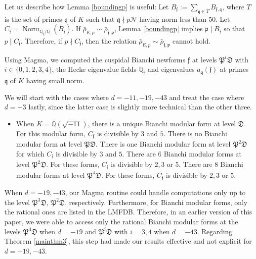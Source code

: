 \documentclass[]{article}
\newcommand {\QQ}{{\mathbb{Q}}}
\newcommand {\mfp}{{\mathfrak{P}}}
\DeclareMathOperator{\Norm}{Norm}
\newcounter{cases}
\begin{document}
Let us describe how Lemma \ref{boundingp} is useful: Let $B_{\mathfrak{f}}:=\sum_{\mathfrak{q} \in T} B_{\mathfrak{f}, \mathfrak{q}}$, where $T$ is the set of primes $\mathfrak{q}$ of $K$ such that $\mathfrak{q}\nmid p\mathcal{N}$ having norm less than $50$. Let $C_{\mathfrak{f}}=\Norm_{\QQ_\mathfrak{f}/\QQ}(B_{\mathfrak{f}})$. If $\bar{\rho}_{E, p} \sim \bar{\rho}_{\mathfrak{f}, \mathfrak{p}}$, Lemma \ref{boundingp} implies $\mathfrak{p}\mid B_{\mathfrak{f}}$ so that $p\mid C_{\mathfrak{f}}$. Therefore, if $p\nmid C_{\mathfrak{f}}$, then the relation $\bar{\rho}_{E, p} \sim \bar{\rho}_{\mathfrak{f}, \mathfrak{p}}$ cannot hold.


Using Magma, we computed the cuspidal Bianchi newforms $\mathfrak{f}$ at levels $\mfp^i\mathfrak{D}$ with $i\in\{0,1,2,3,4\}$, the Hecke eigenvalue fields $\QQ_{\mathfrak{f}}$ and eigenvalues $a_{\mathfrak{q}}({\mathfrak{f}})$ at primes $\mathfrak{q}$ of $K$ having small norm.

We will start with the cases where $d=-11,-19,-43$ and treat the case where $d=-3$ lastly, since the latter case is slightly more technical than the other three.


\begin{itemize}
    \item When $K=\QQ(\sqrt{-11})$, there is a unique Bianchi modular form at level $\mathfrak{D}$. For this modular form, $C_{\mathfrak{f}}$ is divisible by $3$ and $5$. There is no Bianchi modular form at level $\mfp\mathfrak{D}$. There is one Bianchi modular form at level $\mfp^2\mathfrak{D}$ for which $C_{\mathfrak{f}}$ is divisible by $3$ and $5$. There are $6$ Bianchi modular forms at level $\mfp^2\mathfrak{D}$. For these forms, $C_{\mathfrak{f}}$ is divisible by $2,3$ or $5$. There are $8$ Bianchi modular forms at level $\mfp^4\mathfrak{D}$. For these forms, $C_{\mathfrak{f}}$ is divisible by $2,3$ or $5$.
\end{itemize}

When $d=-19,-43$, our Magma routine could handle computations only up to the level $\mfp^3\mathfrak{D}$, $\mfp^2\mathfrak{D}$, respectively. Furthermore, for Bianchi modular forms, only the rational ones are listed in the LMFDB. Therefore, in an earlier version of this paper, we were able to access only the rational Bianchi modular forms at the levels $\mfp^4\mathfrak{D}$ when $d=-19$ and $\mfp^i\mathfrak{D}$ with $i=3,4$ when $d=-43$. Regarding Theorem \ref{mainthm3}, this step had made our results effective and not explicit for $d=-19,-43$. 
\end{document}
